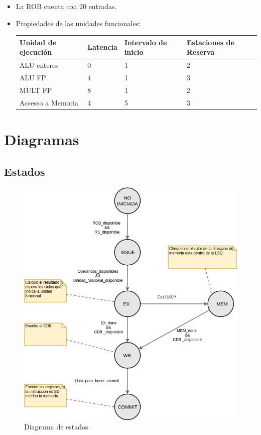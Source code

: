 \documentclass[a4paper]{article}
\begin{document}
	  \begin{itemize}
		\item La ROB cuenta con 20 entradas.
		\item Propiedades de las unidades funcionales:
		\begin{table}[]
			\centering
			\begin{tabular}{|l|l|l|l|}
				\hline
				\textbf{Unidad de ejecución} & \textbf{Latencia} & \textbf{Intervalo de inicio} & \textbf{Estaciones de Reserva} \\ \hline
				ALU enteros                  & 0                 & 1                            & 2                              \\ \hline
				ALU FP                       & 4                 & 1                            & 3                              \\ \hline
				MULT FP                      & 8                 & 1                            & 2                              \\ \hline
				Accesso a Memoria                      & 4                 & 5                            & 3                              \\ \hline
			\end{tabular}
		\end{table}
	\end{itemize}
		
	\section{Diagramas}

	\subsection*{Estados}

	\begin{figure}[H]
		\centering
		\includegraphics[width=.7\textwidth]{figures/estados.png}
		\caption{\label{fig:estados}Diagrama de estados.}
	\end{figure}
  
\end{document}

